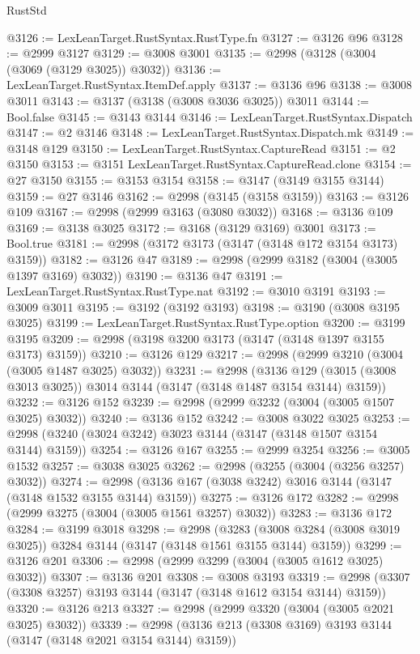 \begin{lexlean}{RustStd}
\begin{coremodule}
@3126 := LexLeanTarget.RustSyntax.RustType.fn
@3127 := @3126 @96
@3128 := @2999 @3127
@3129 := @3008 @3001
@3135 := @2998 (@3128 (@3004 (@3069 (@3129 @3025)) @3032))
@3136 := LexLeanTarget.RustSyntax.ItemDef.apply
@3137 := @3136 @96
@3138 := @3008 @3011
@3143 := @3137 (@3138 (@3008 @3036 @3025)) @3011
@3144 := Bool.false
@3145 := @3143 @3144
@3146 := LexLeanTarget.RustSyntax.Dispatch
@3147 := @2 @3146
@3148 := LexLeanTarget.RustSyntax.Dispatch.mk
@3149 := @3148 @129
@3150 := LexLeanTarget.RustSyntax.CaptureRead
@3151 := @2 @3150
@3153 := @3151 LexLeanTarget.RustSyntax.CaptureRead.clone
@3154 := @27 @3150
@3155 := @3153 @3154
@3158 := @3147 (@3149 @3155 @3144)
@3159 := @27 @3146
@3162 := @2998 (@3145 (@3158 @3159))
@3163 := @3126 @109
@3167 := @2998 (@2999 @3163 (@3080 @3032))
@3168 := @3136 @109
@3169 := @3138 @3025
@3172 := @3168 (@3129 @3169) @3001
@3173 := Bool.true
@3181 := @2998 (@3172 @3173 (@3147 (@3148 @172 @3154 @3173) @3159))
@3182 := @3126 @47
@3189 := @2998 (@2999 @3182 (@3004 (@3005 @1397 @3169) @3032))
@3190 := @3136 @47
@3191 := LexLeanTarget.RustSyntax.RustType.nat
@3192 := @3010 @3191
@3193 := @3009 @3011
@3195 := @3192 (@3192 @3193)
@3198 := @3190 (@3008 @3195 @3025)
@3199 := LexLeanTarget.RustSyntax.RustType.option
@3200 := @3199 @3195
@3209 := @2998 (@3198 @3200 @3173 (@3147 (@3148 @1397 @3155 @3173) @3159))
@3210 := @3126 @129
@3217 := @2998 (@2999 @3210 (@3004 (@3005 @1487 @3025) @3032))
@3231 := @2998
    (@3136 @129 (@3015 (@3008 @3013 @3025)) @3014 @3144 (@3147 (@3148 @1487 @3154 @3144) @3159))
@3232 := @3126 @152
@3239 := @2998 (@2999 @3232 (@3004 (@3005 @1507 @3025) @3032))
@3240 := @3136 @152
@3242 := @3008 @3022 @3025
@3253 := @2998 (@3240 (@3024 @3242) @3023 @3144 (@3147 (@3148 @1507 @3154 @3144) @3159))
@3254 := @3126 @167
@3255 := @2999 @3254
@3256 := @3005 @1532
@3257 := @3038 @3025
@3262 := @2998 (@3255 (@3004 (@3256 @3257) @3032))
@3274 := @2998 (@3136 @167 (@3038 @3242) @3016 @3144 (@3147 (@3148 @1532 @3155 @3144) @3159))
@3275 := @3126 @172
@3282 := @2998 (@2999 @3275 (@3004 (@3005 @1561 @3257) @3032))
@3283 := @3136 @172
@3284 := @3199 @3018
@3298 := @2998
    (@3283 (@3008 @3284 (@3008 @3019 @3025)) @3284 @3144 (@3147 (@3148 @1561 @3155 @3144) @3159))
@3299 := @3126 @201
@3306 := @2998 (@2999 @3299 (@3004 (@3005 @1612 @3025) @3032))
@3307 := @3136 @201
@3308 := @3008 @3193
@3319 := @2998 (@3307 (@3308 @3257) @3193 @3144 (@3147 (@3148 @1612 @3154 @3144) @3159))
@3320 := @3126 @213
@3327 := @2998 (@2999 @3320 (@3004 (@3005 @2021 @3025) @3032))
@3339 := @2998 (@3136 @213 (@3308 @3169) @3193 @3144 (@3147 (@3148 @2021 @3154 @3144) @3159))

\end{coremodule}
\end{lexlean}
